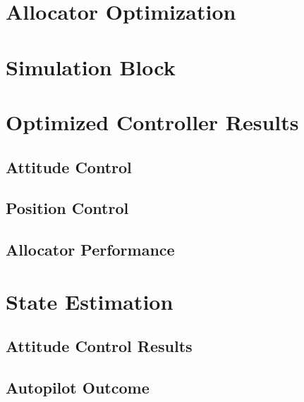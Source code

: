 \section{Allocator Optimization}
\label{sec:simulation.allocator}
\section{Simulation Block}
\label{sec:simulation.block}
\section{Optimized Controller Results}
\label{sec:simulation.comparison}
\subsection{Attitude Control}
\label{subsec:simulation.comparison.attitude}
\subsection{Position Control}
\label{subsec:simulation.comparison.position}
\subsection{Allocator Performance}
\section{State Estimation}
\label{sec:simulation.state}
\subsection{Attitude Control Results}
\subsection{Autopilot Outcome}
